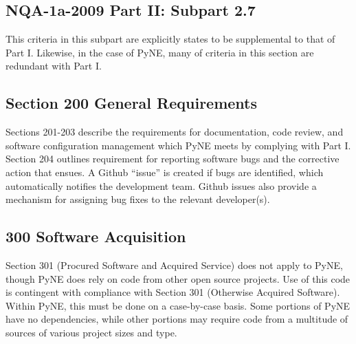\documentclass{anstrans}
\begin{document}
\subsection{NQA-1a-2009 Part II: Subpart 2.7}

This criteria in this subpart are explicitly states to be supplemental to that
of Part I. Likewise, in the case of PyNE, many of criteria in this section are
redundant with Part I.

\subsection{Section 200 General Requirements}

Sections 201-203 describe the requirements for documentation, code review, and
software configuration management which PyNE meets by complying with Part I.
Section 204 outlines requirement for reporting software bugs and the corrective
action that ensues. A Github ``issue'' is created if bugs are identified, which
automatically notifies the development team. Github
issues also provide a mechanism for assigning bug fixes to the relevant
developer(s). 


\subsection{300 Software Acquisition}

Section 301 (Procured Software and Acquired Service) does not apply to PyNE,
though PyNE does rely on code from other open source projects. Use of this code
is contingent with compliance with Section 301 (Otherwise Acquired Software).
Within PyNE, this must be done on a case-by-case basis. Some portions of PyNE
have no dependencies, while other portions may require code from a multitude of
sources of various project sizes and type.

\end{document}
